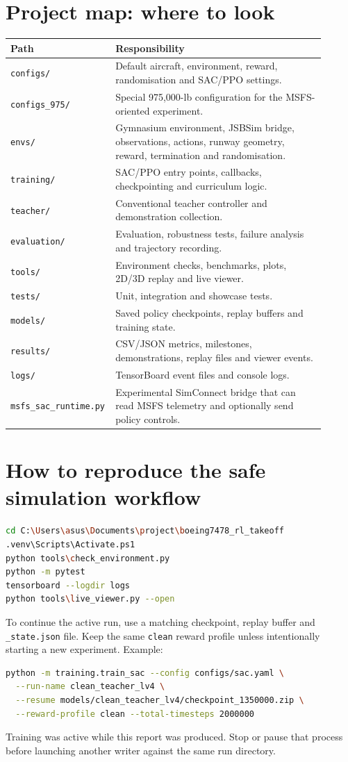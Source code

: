 \documentclass[11pt,a4paper]{article}
\begin{document}
\section{Project map: where to look}
\begin{longtable}{p{0.24\linewidth}p{0.66\linewidth}}\toprule
\textbf{Path} & \textbf{Responsibility}\\\midrule
\texttt{configs/} & Default aircraft, environment, reward, randomisation and SAC/PPO settings.\\
\texttt{configs\_975/} & Special 975,000-lb configuration for the MSFS-oriented experiment.\\
\texttt{envs/} & Gymnasium environment, JSBSim bridge, observations, actions, runway geometry, reward, termination and randomisation.\\
\texttt{training/} & SAC/PPO entry points, callbacks, checkpointing and curriculum logic.\\
\texttt{teacher/} & Conventional teacher controller and demonstration collection.\\
\texttt{evaluation/} & Evaluation, robustness tests, failure analysis and trajectory recording.\\
\texttt{tools/} & Environment checks, benchmarks, plots, 2D/3D replay and live viewer.\\
\texttt{tests/} & Unit, integration and showcase tests.\\
\texttt{models/} & Saved policy checkpoints, replay buffers and training state.\\
\texttt{results/} & CSV/JSON metrics, milestones, demonstrations, replay files and viewer events.\\
\texttt{logs/} & TensorBoard event files and console logs.\\
\texttt{msfs\_sac\_runtime.py} & Experimental SimConnect bridge that can read MSFS telemetry and optionally send policy controls.\\\bottomrule\end{longtable}
\section{How to reproduce the safe simulation workflow}
\begin{lstlisting}[language=bash]
cd C:\Users\asus\Documents\project\boeing7478_rl_takeoff
.venv\Scripts\Activate.ps1
python tools\check_environment.py
python -m pytest
tensorboard --logdir logs
python tools\live_viewer.py --open
\end{lstlisting}
To continue the active run, use a matching checkpoint, replay buffer and \texttt{\_state.json} file. Keep the same \texttt{clean} reward profile unless intentionally starting a new experiment. Example:
\begin{lstlisting}[language=bash]
python -m training.train_sac --config configs/sac.yaml \
  --run-name clean_teacher_lv4 \
  --resume models/clean_teacher_lv4/checkpoint_1350000.zip \
  --reward-profile clean --total-timesteps 2000000
\end{lstlisting}
Training was active while this report was produced. Stop or pause that process before launching another writer against the same run directory.
\end{document}
